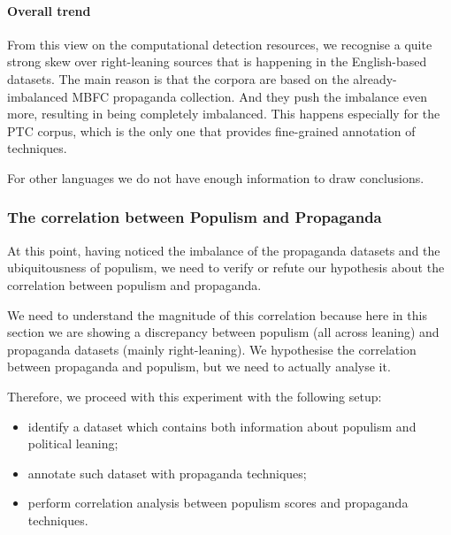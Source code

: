 \paragraph{Overall trend}
From this view on the computational detection resources, we recognise a quite strong skew over right-leaning sources that is happening in the English-based datasets.
The main reason is that the corpora are based on the already-imbalanced MBFC propaganda collection. And they push the imbalance even more, resulting in being completely imbalanced.
This happens especially for the PTC corpus, which is the only one that provides fine-grained annotation of techniques.

For other languages we do not have enough information to draw conclusions.



\subsubsection{The correlation between Populism and Propaganda}

At this point, having noticed the imbalance of the propaganda datasets and the ubiquitousness of populism, we need to verify or refute our hypothesis about the correlation between populism and propaganda.

We need to understand the magnitude of this correlation because here in this section we are showing a discrepancy between populism (all across leaning) and propaganda datasets (mainly right-leaning).
We hypothesise the correlation between propaganda and populism, but we need to actually analyse it.




Therefore, we proceed with this experiment with the following setup:

\begin{itemize}
    \item identify a dataset which contains both information about populism and political leaning;
    \item annotate such dataset with propaganda techniques;
    \item perform correlation analysis between populism scores and propaganda techniques.
\end{itemize}

